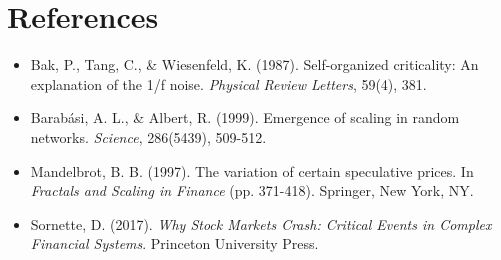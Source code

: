 \documentclass[final,5p,times,twocolumn,authoryear]{elsarticle}
\begin{document}
\section*{References}
\begin{itemize}
    \item Bak, P., Tang, C., \& Wiesenfeld, K. (1987). Self-organized criticality: An explanation of the 1/f noise. \textit{Physical Review Letters}, 59(4), 381.
    \item Barabási, A. L., \& Albert, R. (1999). Emergence of scaling in random networks. \textit{Science}, 286(5439), 509-512.
    \item Mandelbrot, B. B. (1997). The variation of certain speculative prices. In \textit{Fractals and Scaling in Finance} (pp. 371-418). Springer, New York, NY.
    \item Sornette, D. (2017). \textit{Why Stock Markets Crash: Critical Events in Complex Financial Systems}. Princeton University Press.
\end{itemize}
\end{document}
